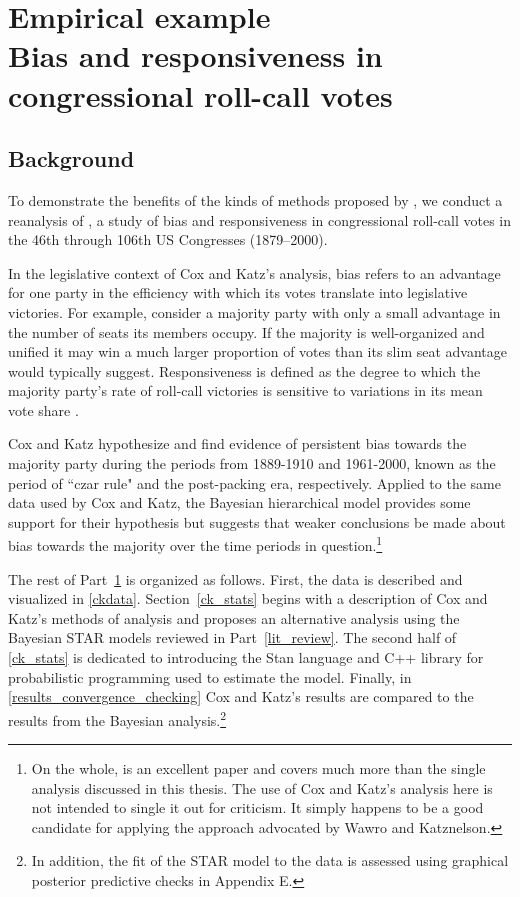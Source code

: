 \chapter[Empirical example: Bias and Responsiveness in Congressional Roll-Call Votes]{Empirical example \\[-20pt]\large Bias and responsiveness in congressional roll-call votes}
\label{cox_katz}

\vspace{-1cm}
\section{Background}
\label{ck_background}

To demonstrate the benefits of the kinds of methods proposed by , 
we conduct a reanalysis of , a study of bias and responsiveness 
in congressional roll-call votes in the 46th through 106th US Congresses (1879--2000). 

In the legislative context of Cox and Katz's analysis, bias refers to an advantage for one party 
in the efficiency with which its votes translate into legislative victories. For example, consider 
a majority party with only a small advantage in the number of seats its members occupy. If the 
majority is well-organized and unified it may win a much larger proportion of votes than its slim 
seat advantage would typically suggest. Responsiveness is defined as the degree to which the 
majority party's rate of roll-call victories is sensitive to variations in its mean vote share 
. 

Cox and Katz hypothesize and find evidence of persistent bias towards the majority party during 
the periods from 1889-1910 and 1961-2000, known as the period of ``czar rule" and the post-packing 
era, respectively. Applied to the same data used by Cox and Katz, the Bayesian hierarchical 
model provides some support for their hypothesis but suggests that weaker conclusions 
be made about bias towards the majority over the time periods in question.\footnote{On the whole, 
 is an excellent paper and covers 
much more than the single analysis discussed in this thesis. The use of Cox and Katz's analysis here
is not intended to single it out for criticism. It simply happens to be a good candidate for applying the 
approach advocated by Wawro and Katznelson.} 

The rest of Part~\ref{cox_katz} is organized as follows. First, the data is described and visualized 
in \ref{ckdata}. Section~\ref{ck_stats} begins with a description of Cox and Katz's methods of analysis 
and proposes an alternative analysis using the Bayesian STAR models reviewed in Part~\ref{lit_review}. 
The second half of \ref{ck_stats} is dedicated to introducing the Stan language and C++ library for 
probabilistic programming used to estimate the model. Finally, in \ref{results_convergence_checking}  
Cox and Katz's results are compared to the results from the Bayesian analysis.\footnote{In addition, the fit of the STAR model to the data is assessed using graphical posterior predictive checks in Appendix E.}  
